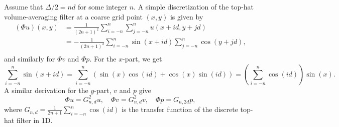 \documentclass[preprint]{elsarticle}
\begin{document}
Assume that $\Delta / 2 = n d$ for some integer $n$. A simple discretization of the
top-hat volume-averaging filter at a coarse grid point $(x, y)$ is given
by
\begin{equation}
    \begin{split}
        (\Phi u)(x, y)
        & =
        \frac{1}{(2 n + 1)^2}
        \sum_{i = -n}^{n}
        \sum_{j = -n}^{n}
        u(x + i d, y + j d) \\
        & =
        - \frac{1}{(2 n + 1)^2}
        \sum_{i = -n}^{n}
        \sin(x + i d)
        \sum_{j = -n}^{n}
        \cos(y + j d), \\
    \end{split}
\end{equation}
and similarly for $\Phi v$ and $\Phi p$.
For the $x$-part, we get
\begin{equation}
    \sum_{i = -n}^{n} \sin(x + i d)
    = \sum_{i = -n}^{n} (\sin(x) \cos(i d) + \cos(x) \sin(i d))
    = \left(\sum_{i = -n}^{n} \cos(i d) \right) \sin(x).
\end{equation}
A similar derivation for the $y$-part, $v$ and $p$ give
\begin{equation}
    \Phi u = G_{n, d}^2 u, \quad
    \Phi v = G_{n, d}^2 v, \quad
    \Phi p = G_{n, 2d} p,
\end{equation}
where $G_{n, d} = \frac{1}{2 n + 1} \sum_{i = -n}^n \cos(i d)$
is the transfer function of the discrete top-hat filter in 1D.
\end{document}
